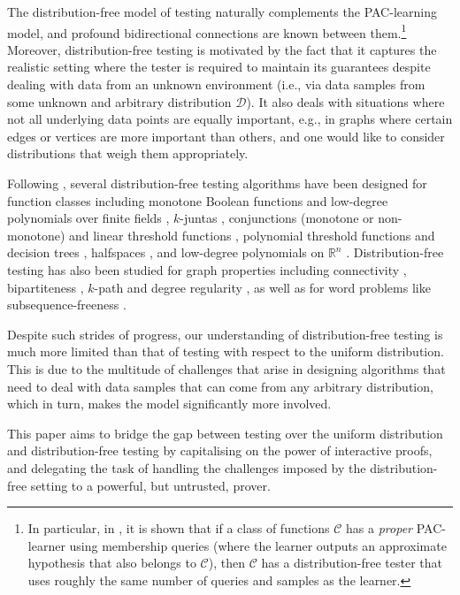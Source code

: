 \documentclass[11pt]{article}
\newcommand{\R}{\mathbb{R}}
\newcommand{\sD}{\mathcal{D}}
\begin{document}
The distribution-free model of testing naturally complements the PAC-learning model, and profound bidirectional connections are known between them.\footnote{In particular, in \cite{GGR98}, it is shown that if a class of functions $\mathcal{C}$ has a \textit{proper} PAC-learner using membership queries (where the learner outputs an approximate hypothesis that also belongs to $\mathcal{C}$), then $\mathcal{C}$ has a distribution-free tester that uses roughly the same number of queries and samples as the learner.} Moreover, distribution-free testing is motivated by the fact that it captures the realistic setting where the tester is required to maintain its guarantees despite dealing with data from an unknown environment (i.e., via data samples from some unknown and arbitrary distribution $\sD$). It also deals with situations where not all underlying data points are equally important, e.g., in graphs where certain edges or vertices are more important than others, and one would like to consider distributions that weigh them appropriately.

Following \cite{GGR98}, several distribution-free testing algorithms have been designed for function classes including monotone Boolean functions and low-degree polynomials over finite fields \cite{HalKush}, $k$-juntas \cite{LCSSX18,bshouty19,Belovs19}, conjunctions (monotone or non-monotone) and linear threshold functions \cite{GlasServ, ChenXie}, polynomial threshold functions and decision trees \cite{BFM21}, halfspaces \cite{BFM21,XP22}, and low-degree polynomials on $\R^n$ \cite{dflin,ABFKY23}. Distribution-free testing has also been studied for graph properties including connectivity \cite{HK08}, bipartiteness \cite{goldreich_biparite}, $k$-path and degree regularity \cite{goldreich_2019_graphtest}, as well as for word problems like subsequence-freeness \cite{RR22}.

Despite such strides of progress, our understanding of distribution-free testing is much more limited than that of testing with respect to the uniform distribution. This is due to the multitude of challenges that arise in designing algorithms that need to deal with data samples that can come from any arbitrary distribution, which in turn, makes the model significantly more involved.

This paper aims to bridge the gap between testing over the uniform distribution and distribution-free testing by capitalising on the power of interactive proofs, and delegating the task of handling the challenges imposed by the distribution-free setting to a powerful, but untrusted, prover.
\end{document}
